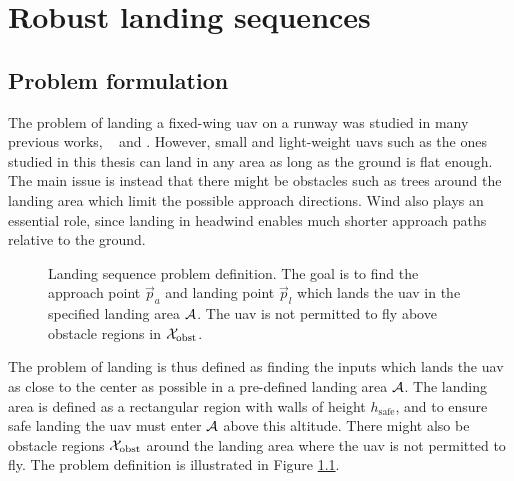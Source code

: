 \chapter{Robust landing sequences}\label{cha:landing}
\section{Problem formulation}
The problem of landing a fixed-wing \ac{uav} on a runway was studied in many previous works, \eg\ \cite{emergency_landing} and \cite{landing_on_vehicle}. However, small and light-weight \acp{uav} such as the ones studied 
in this thesis can land in any area as long as the ground is flat enough. The main issue is instead that there might be obstacles such as trees around the landing area which limit the possible 
approach directions. Wind also plays an essential role, since landing in headwind enables much shorter approach paths relative to the ground.

\begin{figure}
    \begin{center}
    \end{center}
    \caption{Landing sequence problem definition. The goal is to find the approach point $\vec{p}_a$ and landing point $\vec{p}_l$ which lands the \ac{uav} in the specified landing area $\mathcal{A}$. The \ac{uav} is not permitted to fly above obstacle regions in $\mathcal{X}_{\text{obst}}$.}
    \label{fig:land}          
\end{figure}

The problem of landing is thus defined as finding the inputs which lands the \ac{uav} as close to the center as possible in a pre-defined landing area $\mathcal{A}$. The landing area is 
defined as a rectangular region with walls of height $h_{\text{safe}}$, and to ensure safe landing the \ac{uav} must enter $\mathcal{A}$ above this altitude. 
There might also be obstacle regions $\mathcal{X}_{\text{obst}}$ around the landing area where the \ac{uav} is not permitted to fly. The problem definition is illustrated in Figure \ref{fig:land}.

